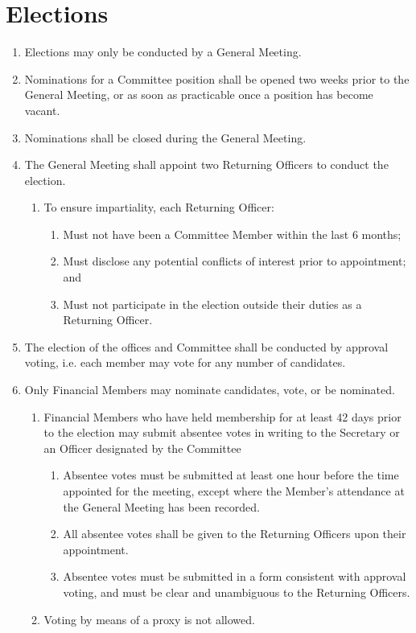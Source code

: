 \documentclass[a4paper]{article}
\begin{document}
\section{Elections} \label{sec:elections}
\begin{enumerate}
    \item Elections may only be conducted by a General Meeting.
    \item Nominations for a Committee position shall be opened two weeks prior to the General Meeting, or as soon as practicable once a position has become vacant.
    \item Nominations shall be closed during the General Meeting.
    \item The General Meeting shall appoint two Returning Officers to conduct the election.
    \begin{enumerate}
        \item To ensure impartiality, each Returning Officer:
        \begin{enumerate}
            \item Must not have been a Committee Member within the last 6 months;
            \item Must disclose any potential conflicts of interest prior to appointment; and
            \item Must not participate in the election outside their duties as a Returning Officer.
        \end{enumerate}
    \end{enumerate}
    \item The election of the offices and Committee shall be conducted by approval voting, i.e. each member may vote for any number of candidates.
    \item Only Financial Members may nominate candidates, vote, or be nominated.
        \begin{enumerate}
            \item Financial Members who have held membership for at least 42 days prior to the election may submit absentee votes in writing to the Secretary or an Officer designated by the Committee
            \begin{enumerate}
                \item Absentee votes must be submitted at least one hour before the time appointed for the meeting, except where the Member’s attendance at the General Meeting has been recorded.
                \item All absentee votes shall be given to the Returning Officers upon their appointment.
                \item Absentee votes must be submitted in a form consistent with approval voting, and must be clear and unambiguous to the Returning Officers.
            \end{enumerate}
            \item Voting by means of a proxy is not allowed.
        \end{enumerate}
\end{enumerate}
\end{document}
